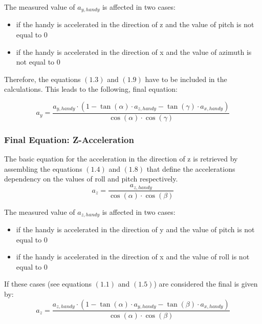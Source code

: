 \documentclass[12pt, a4paper, oneside, british]{article}
\begin{document}
\noindent The measured value of $a_{y,handy}$ is affected in two cases:
\begin{itemize}
\item{if the handy is accelerated in the direction of z and the value of pitch is not equal to 0}
\item{if the handy is accelerated in the direction of x and the value of azimuth is not equal to 0}
\end{itemize}
Therefore, the equations $(1.3)$ and $(1.9)$ have to be included in the
calculations.
This leads to the following, final equation:

\begin{equation}
a_y = \frac{a_{y, handy} \cdot (1 - \tan(\alpha) \cdot a_{z, handy}
- \tan(\gamma) \cdot a_{x, handy})}{\cos(\alpha) \cdot \cos(\gamma)}
\end{equation}

\subsubsection{Final Equation: Z-Acceleration }
The basic equation for the acceleration in the direction of z is retrieved by assembling the equations $(1.4)$ and $(1.8)$ that define the accelerations dependency on the values of roll and pitch respectively. 
\begin{equation}
a_z = \frac{a_{z, handy}}{\cos(\alpha) \cdot \cos(\beta)}
\end{equation}

\noindent The measured value of $a_{z,handy}$ is affected in two cases:
\begin{itemize}
\item{if the handy is accelerated in the direction of y and the value of pitch is not equal to 0}
\item{if the handy is accelerated in the direction of x and the value of roll is not equal to 0}
\end{itemize}

If these cases (see equations $(1.1)$ and $(1.5)$) are considered the final is given by:
\begin{equation}
a_z = \frac{a_{z, handy} \cdot (1 - \tan(\alpha) \cdot a_{y, handy}
- \tan(\beta) \cdot a_{x, handy})}{\cos(\alpha) \cdot \cos(\beta)}
\end{equation}
\end{document}
